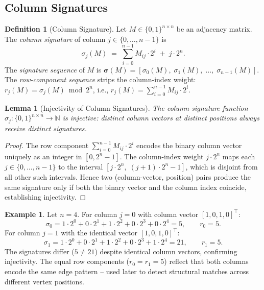 ﻿\documentclass[12pt,a4paper]{article}
\theoremstyle{plain}
\newtheorem{lemma}[theorem]{Lemma}
\theoremstyle{definition}
\newtheorem{definition}[theorem]{Definition}
\newtheorem{example}[theorem]{Example}
\theoremstyle{remark}
\begin{document}
	\subsection{Column Signatures}

	\begin{definition}[Column Signature]
		\label{def:signature}
		Let $M \in \{0,1\}^{n \times n}$ be an adjacency matrix.  The
		\emph{column signature} of column $j \in \{0, \ldots, n-1\}$ is
		\[
		\sigma_j(M) \;=\; \sum_{i=0}^{n-1} M_{ij} \cdot 2^i \;+\; j \cdot 2^n.
		\]
		The \emph{signature sequence} of $M$ is
		$\boldsymbol{\sigma}(M) = [\sigma_0(M),\; \sigma_1(M),\; \ldots,\; \sigma_{n-1}(M)]$.
		The \emph{row-component sequence} strips the column-index weight:
		$r_j(M) = \sigma_j(M) \bmod 2^n$, i.e.,
		$r_j(M) = \sum_{i=0}^{n-1} M_{ij} \cdot 2^i$.
	\end{definition}

	\begin{lemma}[Injectivity of Column Signatures]
		\label{lem:injective}
		The column signature function $\sigma_j : \{0,1\}^{n \times n} \to \mathbb{N}$
		is injective: distinct column vectors at distinct positions always receive
		distinct signatures.
	\end{lemma}

	\begin{proof}
		The row component $\sum_{i=0}^{n-1} M_{ij} \cdot 2^i$ encodes the binary
		column vector uniquely as an integer in $[0, 2^n - 1]$.  The column-index
		weight $j \cdot 2^n$ maps each $j \in \{0, \ldots, n-1\}$ to the interval
		$[j \cdot 2^n,\; (j+1) \cdot 2^n - 1]$, which is disjoint from all other
		such intervals.  Hence two (column-vector, position) pairs produce the
		same signature only if both the binary vector and the column index coincide,
		establishing injectivity.
	\end{proof}

	\begin{example}
		\label{ex:signatures}
		Let $n = 4$.  For column $j = 0$ with column vector $[1, 0, 1, 0]^{\top}$:
		\[
		\sigma_0 = 1{\cdot}2^0 + 0{\cdot}2^1 + 1{\cdot}2^2 + 0{\cdot}2^3
		          + 0{\cdot}2^4 = 5, \qquad r_0 = 5.
		\]
		For column $j = 1$ with the identical vector $[1, 0, 1, 0]^{\top}$:
		\[
		\sigma_1 = 1{\cdot}2^0 + 0{\cdot}2^1 + 1{\cdot}2^2 + 0{\cdot}2^3
		          + 1{\cdot}2^4 = 21, \qquad r_1 = 5.
		\]
		The signatures differ ($5 \neq 21$) despite identical column vectors,
		confirming injectivity.  The equal row components ($r_0 = r_1 = 5$) reflect
		that both columns encode the same edge pattern -- used later to detect
		structural matches across different vertex positions.
	\end{example}
\end{document}
